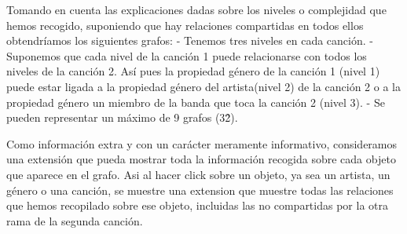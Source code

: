 Tomando en cuenta las explicaciones dadas sobre los niveles o complejidad que hemos recogido, suponiendo que hay relaciones compartidas en todos ellos obtendríamos los siguientes grafos:
- Tenemos tres niveles en cada canción.
- Suponemos que cada nivel de la canción 1 puede relacionarse con todos los niveles de la canción 2. Así pues la propiedad género de la canción 1 (nivel 1) puede estar ligada a la propiedad género del artista(nivel 2) de la canción 2 o a la propiedad género un miembro de la banda que toca la canción 2 (nivel 3).
- Se pueden representar un máximo de 9 grafos (3\^2).

Como información extra y con un carácter meramente informativo, consideramos una extensión que pueda mostrar toda la información recogida sobre cada objeto que aparece en el grafo. Asi al hacer click sobre un objeto, ya sea un artista, un género o una canción, se muestre una extension que muestre todas las relaciones que hemos recopilado sobre ese objeto, incluidas las no compartidas por la otra rama de la segunda canción.